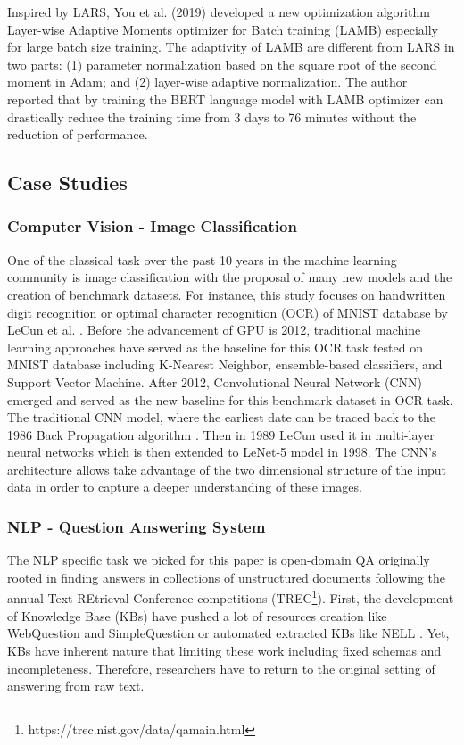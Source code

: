 Inspired by LARS, You et al. (2019) developed a new optimization algorithm Layer-wise Adaptive Moments optimizer for Batch training (LAMB) especially for large batch size training. The adaptivity of LAMB are different from LARS in two parts: (1) parameter normalization based on the square root of the second moment in Adam; and (2) layer-wise adaptive normalization. The author reported that by training the BERT language model with LAMB optimizer can drastically reduce the training time from 3 days to 76 minutes without the reduction of performance.

\subsection{Case Studies}

\subsubsection{Computer Vision - Image Classification}

One of the classical task over the past 10 years in the machine learning community is image classification with the proposal of many new models and the creation of benchmark datasets. For instance, this study focuses on handwritten digit recognition or optimal character recognition (OCR) of MNIST database by LeCun et al. \cite{}. Before the advancement of GPU is 2012, traditional machine learning approaches have served as the baseline for this OCR task tested on MNIST database including K-Nearest Neighbor, ensemble-based classifiers, and Support Vector Machine. After 2012, Convolutional Neural Network (CNN) emerged and served as the new baseline for this benchmark dataset in OCR task.
The traditional CNN model, where the earliest date can be traced back
to the 1986 Back Propagation algorithm \cite{}. Then in 1989 LeCun used it
in multi-layer neural networks \cite{} which is then extended to LeNet-5 model in 1998. The CNN's architecture allows take advantage of the
two dimensional structure of the input data in order to capture a deeper understanding of these images.

\subsubsection{NLP - Question Answering System}

The NLP specific task we picked for this paper is open-domain QA originally rooted in finding answers in collections of unstructured documents following the annual Text REtrieval Conference competitions (TREC\footnote{https://trec.nist.gov/data/qamain.html}). First, the development of Knowledge Base (KBs) have pushed a lot of resources creation like WebQuestion \cite{} and SimpleQuestion \cite{} or automated extracted KBs like NELL \cite{}. Yet, KBs have inherent nature that limiting these work including fixed schemas and incompleteness. Therefore, researchers have to return to the original setting of answering from raw text. 

